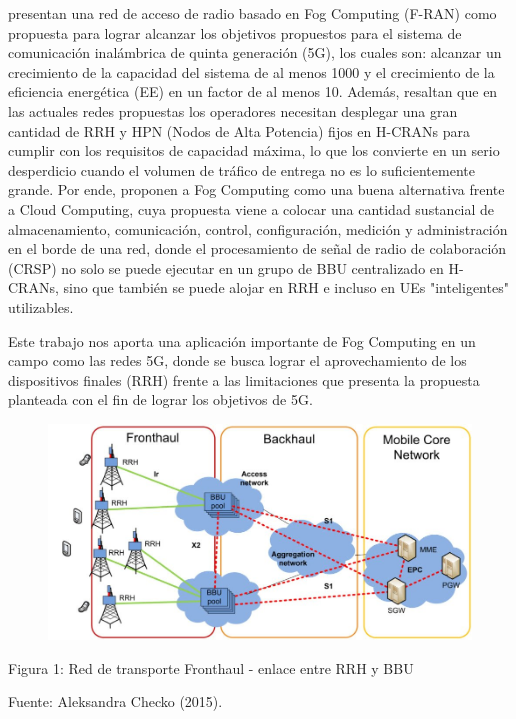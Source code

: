         {\bf\cite{mugen2015}}presentan una red de acceso de radio basado en Fog Computing (F-RAN) como propuesta para lograr alcanzar los objetivos propuestos para el sistema de comunicación inalámbrica de quinta generación (5G), los cuales son: alcanzar un crecimiento de la capacidad del sistema de al menos 1000 y el crecimiento de la eficiencia energética (EE) en un factor de al menos 10.   Además, resaltan que en las actuales redes propuestas los operadores necesitan desplegar una gran cantidad de RRH y HPN (Nodos de Alta Potencia) fijos en H-CRANs para cumplir con los requisitos de capacidad máxima, lo que los convierte en un serio desperdicio cuando el volumen de tráfico de entrega no es lo suficientemente grande. Por ende, proponen a Fog Computing como una buena alternativa frente a Cloud Computing, cuya propuesta viene a colocar una cantidad sustancial de almacenamiento, comunicación, control, configuración, medición y administración en el borde de una red, donde el procesamiento de señal de radio de colaboración (CRSP) no solo se puede ejecutar en un grupo de BBU centralizado en H-CRANs, sino que también se puede alojar en RRH e incluso en UEs "inteligentes" utilizables.\par
        Este trabajo nos aporta una aplicación importante de Fog Computing en un campo como las redes 5G, donde se busca lograr el aprovechamiento de los dispositivos finales (RRH) frente a las limitaciones que presenta la propuesta planteada con el fin de lograr los objetivos de 5G.\par     
        \begin{figure}[ht]
            \begin{center}
                \includegraphics[width=.8\textwidth]{redFronthaul}
            \end{center}
        \end{figure}
        \begin{center}
            { Figura 1: Red de transporte Fronthaul - enlace entre RRH y BBU }\par 
            { Fuente: Aleksandra Checko (2015). }
        \end{center}   
